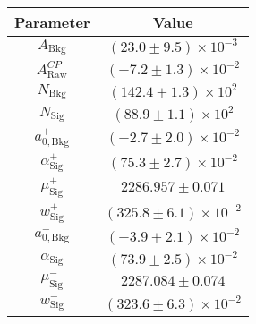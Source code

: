 \begin{tabular}{cc}
  \toprule
  Parameter & Value \\
  \midrule
$A_{\mathrm{Bkg}}$ & $(23.0 \pm 9.5) \times 10^{-3}$ \\
$A_{\mathrm{Raw}}^{C\!P}$ & $(-7.2 \pm 1.3) \times 10^{-2}$ \\
$N_{\mathrm{Bkg}}$ & $(142.4 \pm 1.3) \times 10^{2}$ \\
$N_{\mathrm{Sig}}$ & $(88.9 \pm 1.1) \times 10^{2}$ \\
$a_{0,\mathrm{Bkg}}^{+}$ & $(-2.7 \pm 2.0) \times 10^{-2}$ \\
$\alpha_{\mathrm{Sig}}^{+}$ & $(75.3 \pm 2.7) \times 10^{-2}$ \\
$\mu_{\mathrm{Sig}}^{+}$ & $2286.957 \pm 0.071$ \\
$w_{\mathrm{Sig}}^{+}$ & $(325.8 \pm 6.1) \times 10^{-2}$ \\
$a_{0,\mathrm{Bkg}}^{-}$ & $(-3.9 \pm 2.1) \times 10^{-2}$ \\
$\alpha_{\mathrm{Sig}}^{-}$ & $(73.9 \pm 2.5) \times 10^{-2}$ \\
$\mu_{\mathrm{Sig}}^{-}$ & $2287.084 \pm 0.074$ \\
$w_{\mathrm{Sig}}^{-}$ & $(323.6 \pm 6.3) \times 10^{-2}$ \\
  \bottomrule
\end{tabular}